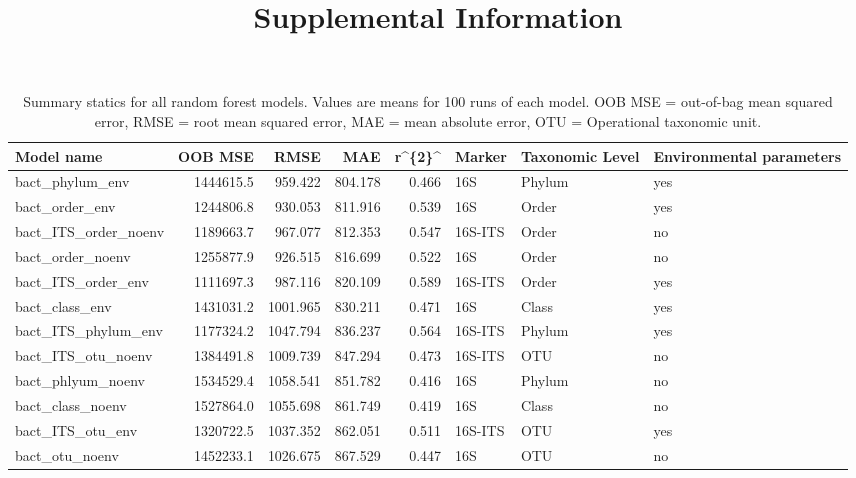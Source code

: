 \documentclass[
  letterpaper,
  DIV=11,
  numbers=noendperiod]{scrartcl}
\title{Supplemental Information}
\author{}
\date{}
\begin{document}
\maketitle
\ifdefined\Shaded\renewenvironment{Shaded}{\begin{tcolorbox}[frame hidden, borderline west={3pt}{0pt}{shadecolor}, interior hidden, sharp corners, enhanced, boxrule=0pt, breakable]}{\end{tcolorbox}}\fi

\begin{table}

\caption{Summary statics for all random forest models. Values are means for 100 runs of each model. OOB MSE = out-of-bag mean squared error, RMSE = root mean squared error, MAE = mean absolute error, OTU = Operational taxonomic unit.}
\centering
\begin{tabular}[t]{lrrrrl>{\raggedright\arraybackslash}p{2cm}>{\raggedright\arraybackslash}p{2cm}}
\toprule
Model name & OOB MSE & RMSE & MAE & r\textasciicircum{}\{2\}\textasciicircum{} & Marker & Taxonomic Level & Environmental parameters\\
\midrule
bact\_phylum\_env & 1444615.5 & 959.422 & 804.178 & 0.466 & 16S & Phylum & yes\\
bact\_order\_env & 1244806.8 & 930.053 & 811.916 & 0.539 & 16S & Order & yes\\
bact\_ITS\_order\_noenv & 1189663.7 & 967.077 & 812.353 & 0.547 & 16S-ITS & Order & no\\
bact\_order\_noenv & 1255877.9 & 926.515 & 816.699 & 0.522 & 16S & Order & no\\
bact\_ITS\_order\_env & 1111697.3 & 987.116 & 820.109 & 0.589 & 16S-ITS & Order & yes\\
\addlinespace
bact\_class\_env & 1431031.2 & 1001.965 & 830.211 & 0.471 & 16S & Class & yes\\
bact\_ITS\_phylum\_env & 1177324.2 & 1047.794 & 836.237 & 0.564 & 16S-ITS & Phylum & yes\\
bact\_ITS\_otu\_noenv & 1384491.8 & 1009.739 & 847.294 & 0.473 & 16S-ITS & OTU & no\\
bact\_phlyum\_noenv & 1534529.4 & 1058.541 & 851.782 & 0.416 & 16S & Phylum & no\\
bact\_class\_noenv & 1527864.0 & 1055.698 & 861.749 & 0.419 & 16S & Class & no\\
\addlinespace
bact\_ITS\_otu\_env & 1320722.5 & 1037.352 & 862.051 & 0.511 & 16S-ITS & OTU & yes\\
bact\_otu\_noenv & 1452233.1 & 1026.675 & 867.529 & 0.447 & 16S & OTU & no\\

\end{tabular}
\end{table}
\end{document}
